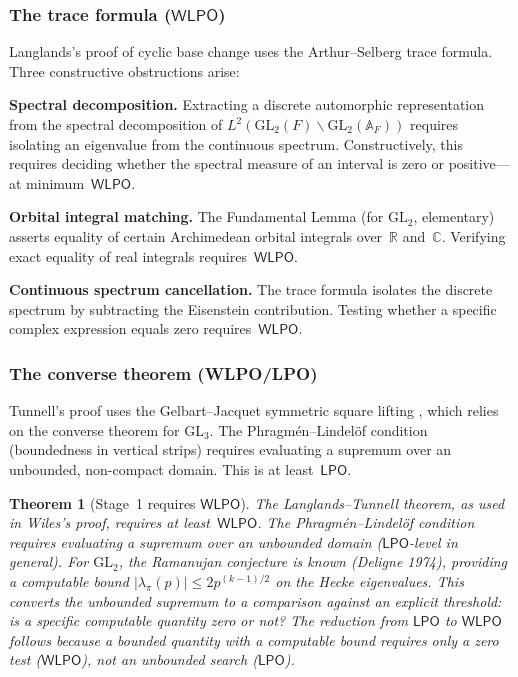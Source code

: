 \documentclass[11pt]{article}
\theoremstyle{plain}
\newtheorem{theorem}{Theorem}[section]
\theoremstyle{definition}
\theoremstyle{remark}
\newcommand{\R}{\mathbb{R}}
\newcommand{\C}{\mathbb{C}}
\newcommand{\A}{\mathbb{A}}
\newcommand{\GL}{\mathrm{GL}}
\newcommand{\LPO}{\mathsf{LPO}}
\newcommand{\WLPO}{\mathsf{WLPO}}
\begin{document}
\subsubsection{The trace formula (\texorpdfstring{$\WLPO$}{WLPO})}

Langlands's proof of cyclic base change \cite{Langlands1980}
uses the Arthur--Selberg trace formula.
Three constructive obstructions arise:

\textbf{Spectral decomposition.}  Extracting a discrete
automorphic representation from the spectral decomposition
of $L^2(\GL_2(F) \backslash \GL_2(\A_F))$ requires isolating an
eigenvalue from the continuous spectrum.
Constructively, this requires deciding whether the spectral
measure of an interval is zero or positive---at minimum~$\WLPO$.

\textbf{Orbital integral matching.}  The Fundamental Lemma
(for $\GL_2$, elementary) asserts equality of certain
Archimedean orbital integrals over~$\R$ and~$\C$.  Verifying
exact equality of real integrals requires~$\WLPO$.

\textbf{Continuous spectrum cancellation.}  The trace formula
isolates the discrete spectrum by subtracting the Eisenstein
contribution.  Testing whether a specific complex expression
equals zero requires~$\WLPO$.

\subsubsection{The converse theorem (WLPO/LPO)}

Tunnell's proof \cite{Tunnell1981} uses the Gelbart--Jacquet
symmetric square lifting \cite{GelbartJacquet1978}, which relies on
the converse theorem for $\GL_3$.  The
Phragm\'en--Lindel\"of condition (boundedness in vertical
strips) requires evaluating a supremum over an unbounded,
non-compact domain.  This is at least~$\LPO$.

\begin{theorem}[Stage~1 requires $\WLPO$]\label{thm:stage1}
The Langlands--Tunnell theorem, as used in Wiles's proof,
requires at least~$\WLPO$.
The Phragm\'en--Lindel\"of condition requires evaluating a supremum
over an unbounded domain ($\LPO$-level in general).  For $\GL_2$,
the Ramanujan conjecture is known (Deligne 1974), providing a
computable bound $|\lambda_\pi(p)| \le 2p^{(k-1)/2}$ on the Hecke
eigenvalues.  This converts the unbounded supremum to a comparison
against an explicit threshold: is a specific computable quantity
zero or not?  The reduction from $\LPO$ to $\WLPO$ follows because
a bounded quantity with a computable bound requires only a zero
test ($\WLPO$), not an unbounded search ($\LPO$).
\end{theorem}
\end{document}
